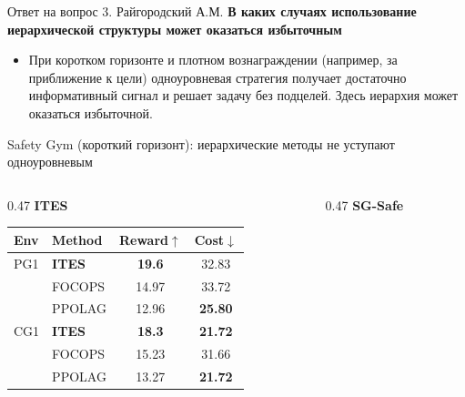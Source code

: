 \begin{frame}[noframenumbering,shrink=5]{Ответ на вопрос 3. Райгородский А.М.}
    \small
    \textbf{В каких случаях использование иерархической структуры может оказаться избыточным}

    \vspace{0.3em}
    \begin{itemize}
        \item При коротком горизонте и плотном вознаграждении (например, за
              приближение к цели) одноуровневая стратегия получает достаточно
              информативный сигнал и решает задачу без подцелей. Здесь
              иерархия может оказаться избыточной.
    \end{itemize}

    \vspace{0.2em}
    \centering
    Safety Gym (короткий горизонт): иерархические методы не уступают
    одноуровневым

    \vspace{0.4em}
    \scriptsize
    \renewcommand{\arraystretch}{1.1}
    \begin{columns}[T,onlytextwidth]
        \begin{column}{0.47\textwidth}
            \centering
            \textbf{ITES}

            \vspace{0.2em}
            \begin{tabular}{llcc}
                \toprule
                Env & Method & Reward$\uparrow$ & Cost$\downarrow$ \\
                \midrule
                PG1 & \textbf{ITES} & \textbf{19.6} & 32.83 \\
                    & FOCOPS & 14.97 & 33.72 \\
                    & PPOLAG & 12.96 & \textbf{25.80} \\
                \midrule[0.2pt]
                CG1 & \textbf{ITES} & \textbf{18.3} & \textbf{21.72} \\
                    & FOCOPS & 15.23 & 31.66 \\
                    & PPOLAG & 13.27 & \textbf{21.72} \\
                \bottomrule
            \end{tabular}
        \end{column}
        \begin{column}{0.47\textwidth}
            \centering
            \textbf{SG-Safe}


\end{column}
\end{columns}
\end{frame}
